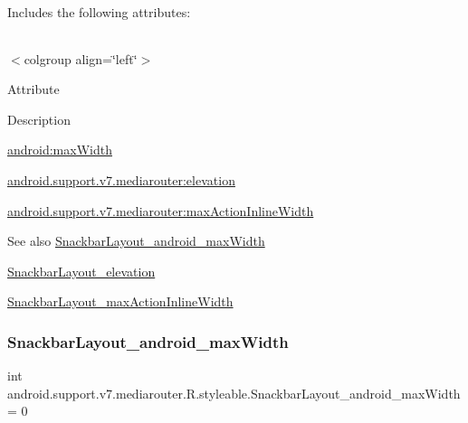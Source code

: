 Includes the following attributes\+:

\tabulinesep=1mm
\begin{longtabu} spread 0pt [c]{*{0}{|X[-1]}|}
\hline
\end{longtabu}
$<$colgroup align=\char`\"{}left\char`\"{}$>$ 

Attribute

Description 

{\ttfamily \hyperlink{classandroid_1_1support_1_1v7_1_1mediarouter_1_1R_1_1styleable_ace4981fa4e502194da89b37910aa611c}{android\+:max\+Width}}

{\ttfamily \hyperlink{classandroid_1_1support_1_1v7_1_1mediarouter_1_1R_1_1styleable_a1367ffb5eb169f89174a1b2c0d5c78f8}{android.\+support.\+v7.\+mediarouter\+:elevation}}

{\ttfamily \hyperlink{classandroid_1_1support_1_1v7_1_1mediarouter_1_1R_1_1styleable_a5dd123494310cce9535c4fb463205145}{android.\+support.\+v7.\+mediarouter\+:max\+Action\+Inline\+Width}}

\begin{DoxySeeAlso}{See also}
\hyperlink{classandroid_1_1support_1_1v7_1_1mediarouter_1_1R_1_1styleable_ace4981fa4e502194da89b37910aa611c}{Snackbar\+Layout\+\_\+android\+\_\+max\+Width} 

\hyperlink{classandroid_1_1support_1_1v7_1_1mediarouter_1_1R_1_1styleable_a1367ffb5eb169f89174a1b2c0d5c78f8}{Snackbar\+Layout\+\_\+elevation} 

\hyperlink{classandroid_1_1support_1_1v7_1_1mediarouter_1_1R_1_1styleable_a5dd123494310cce9535c4fb463205145}{Snackbar\+Layout\+\_\+max\+Action\+Inline\+Width} 
\end{DoxySeeAlso}
\mbox{\label{classandroid_1_1support_1_1v7_1_1mediarouter_1_1R_1_1styleable_ace4981fa4e502194da89b37910aa611c}} 
\subsubsection{\texorpdfstring{Snackbar\+Layout\+\_\+android\+\_\+max\+Width}{SnackbarLayout\_android\_maxWidth}}
{\footnotesize\ttfamily int android.\+support.\+v7.\+mediarouter.\+R.\+styleable.\+Snackbar\+Layout\+\_\+android\+\_\+max\+Width = 0\hspace{0.3cm}{\ttfamily [static]}}

